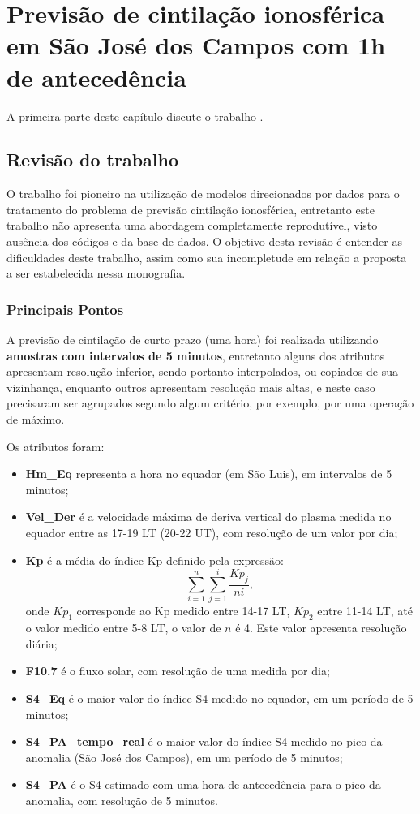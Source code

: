 \chapter{Previsão de cintilação ionosférica em São José dos Campos com 1h de antecedência}\label{ch:revisonrezende}

A primeira parte deste capítulo discute o trabalho \cite{REZENDE:2009}.

\section{Revisão do trabalho \cite{REZENDE:2009}}

O trabalho \cite{REZENDE:2009} foi pioneiro na utilização de modelos direcionados por dados para o tratamento do problema de previsão cintilação ionosférica, entretanto este trabalho não apresenta uma abordagem completamente reprodutível, visto ausência dos códigos e da base de dados. O objetivo desta revisão é entender as dificuldades deste trabalho, assim como sua incompletude em relação a proposta a ser estabelecida nessa monografia.

\subsection{Principais Pontos}

A previsão de cintilação de curto prazo (uma hora) foi realizada utilizando {\bf amostras com intervalos de 5 minutos}, entretanto alguns dos atributos apresentam resolução inferior, sendo portanto interpolados, ou copiados de sua vizinhança, enquanto outros apresentam resolução mais altas, e neste caso precisaram ser agrupados segundo algum critério, por exemplo, por uma operação de máximo.

Os atributos foram:

\begin{itemize}
\item {\bf Hm\_Eq} representa a hora no equador (em São Luis), em intervalos de 5 minutos;
\item {\bf Vel\_Der} é a velocidade máxima de deriva vertical do plasma medida no equador entre as 17-19 LT (20-22 UT), com resolução de um valor por dia;
\item {\bf Kp} é a média do índice Kp definido pela expressão:
\begin{equation}
\sum_{i=1}^{n}\sum_{j=1}^{i}\frac{Kp_{j}}{ni}\mbox{,}~
\end{equation}
onde $Kp_1$ corresponde ao Kp medido entre 14-17 LT, $Kp_2$ entre 11-14 LT, até o valor medido entre 5-8 LT, o valor de $n$ é 4. Este valor apresenta resolução diária;
\item {\bf F10.7} é o fluxo solar, com resolução de uma medida por dia;
\item {\bf S4\_Eq} é o maior valor do índice S4 medido no equador, em um período de 5 minutos;
\item {\bf S4\_PA\_tempo\_real} é o maior valor do índice S4 medido no pico da anomalia (São José dos Campos), em um período de 5 minutos;
\item {\bf S4\_PA} é o S4 estimado com uma hora de antecedência para o pico da anomalia, com resolução de 5 minutos.
\end{itemize}

